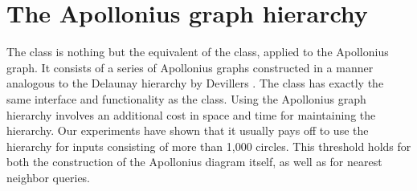 \section{The Apollonius graph hierarchy}
\label{sec:apollonius2-hierarchy}

The  class is nothing but the equivalent of the 
class, applied to the Apollonius graph. It consists of a series of
Apollonius graphs constructed in a manner analogous to the Delaunay
hierarchy by Devillers \cite{d-iirdt-98}. The class
has exactly the same interface and functionality as the
class. Using the Apollonius graph hierarchy involves an additional
cost in space and time for maintaining the hierarchy. Our experiments
have shown that it usually pays off to use the hierarchy for inputs
consisting of more than 1,000 circles. This threshold holds for both
the construction of the Apollonius diagram itself, as well as for
nearest neighbor queries.

